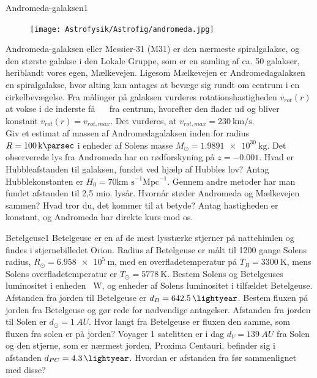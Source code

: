 \begin{opgave}{Andromeda-galaksen}{1}
	\begin{figure}[h!]
		\centering
		\texttt{[image: Astrofysik/Astrofig/andromeda.jpg]}
		\caption{  } %
		\label{andromeda} 
	\end{figure}
	Andromeda-galaksen eller Messier-31 (M31) er den nærmeste spiralgalakse, og den største galakse i den Lokale Gruppe, som er en samling af ca. 50 galakser, heriblandt vores egen, Mælkevejen.  
	\opg Ligesom Mælkevejen er Andromedagalaksen en spiralgalakse, hvor alting kan antages at bevæge sig
	rundt om centrum i en cirkelbevægelse. Fra målinger på galaksen vurderes
	rotationshastigheden $v_{rot}(r)$ at vokse i de inderste få \SI{}{\kilo\parsec} fra centrum, hvorefter den flader ud
	og bliver konstant $v_{rot}(r) = v_{rot,max}$. Det vurderes, at $v_{rot,max} = \SI{230}{\kilo\metre\per\second}$. \\
	Giv et estimat af massen af Andromedagalaksen inden for radius $R = \SI{100}{\kilo\parsec}$ i enheder af Solens masse $M_\odot = \SI{1.9891e30}{\kilo\gram}$.
	\opg Det observerede lys fra Andromeda har en rødforskyning på $z = -0.001$.
	Hvad er Hubbleafstanden til galaksen, fundet ved hjælp af Hubbles lov? Antag Hubblekonstanten er $H_0=70 \text{km s}^{-1} \text{Mpc}^{-1}$.
	\opg Gennem andre metoder har man fundet afstanden til 2,5 mio. lysår. Hvornår støder Andromeda og Mælkevejen sammen? Hvad tror du, det kommer til at betyde? Antag hastigheden er konstant, og Andromeda har direkte kurs mod os.
\end{opgave}

\begin{opgave}{Betelgeuse}{1}
	Betelgeuse er en af de mest lysstærke stjerner på nattehimlen og findes i stjernebilledet Orion. Radius af Betelgeuse er målt til 1200
	gange Solens radius, $R_\odot=\SI{6,958e5}{\metre}$, med en overfladetemperatur på $T_B=\SI{3300}{\kelvin}$, mens Solens overfladetemperatur er $T_\odot=\SI{5778}{\kelvin}$. 
	\opg Bestem Solens og Betelgeuses luminositet i enheden \SI{}{\watt}, og enheder af Solens luminositet i tilfældet Betelgeuse.
	\opg Afstanden fra jorden til Betelgeuse er $d_B=\SI{642,5}{\lightyear}$. Bestem fluxen på jorden fra Betelgeuse og gør rede for nødvendige antagelser.
	\opg Afstanden fra jorden til Solen er $d_\odot=\SI{1}{AU}$. Hvor langt fra Betelgeuse er fluxen den samme, som fluxen fra solen er på jorden?
	\opg Voyager 1 satelitten er i dag $d_V=\SI{139}{AU}$ fra Solen og den stjerne, som er nærmest jorden, Proxima Centauri, befinder sig i afstanden $d_{PC}=\SI{4,3}{\lightyear}$. Hvordan er afstanden fra før sammenlignet med disse?
\end{opgave}

